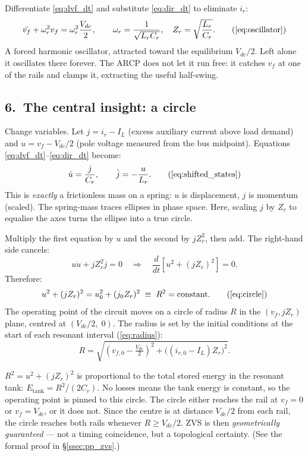 \documentclass[12pt, a4paper]{article}
\def\,{ }%
\newcommand{\Vdc}{V_{dc}}
\newcommand{\vf}{v_f}
\newcommand{\ir}{i_r}
\newcommand{\IL}{I_L}
\newcommand{\Lr}{L_r}
\newcommand{\Cr}{C_r}
\newcommand{\omegar}{\omega_r}
\newcommand{\Zr}{Z_r}
\begin{document}
Differentiate \eqref{eq:dvf_dt} and substitute \eqref{eq:dir_dt} to
eliminate $\ir$:
\begin{equation}
    \ddot{\vf} + \omegar^2\,\vf = \omegar^2\,\frac{\Vdc}{2},
    \qquad
    \omegar = \frac{1}{\sqrt{\Lr\Cr}},\quad
    \Zr = \sqrt{\frac{\Lr}{\Cr}}.
    \tag{\ref{eq:oscillator}}
\end{equation}
A forced harmonic oscillator, attracted toward the equilibrium $\Vdc/2$.
Left alone it oscillates there forever.
The ARCP does not let it run free: it catches $\vf$ at one of the rails and
clamps it, extracting the useful half-swing.

\subsection*{6.\ The central insight: a circle}

Change variables.
Let $j = \ir - \IL$ (excess auxiliary current above load demand) and
$u = \vf - \Vdc/2$ (pole voltage measured from the bus midpoint).
Equations \eqref{eq:dvf_dt}--\eqref{eq:dir_dt} become:
\begin{equation}
    \dot{u} = \frac{j}{\Cr},\qquad \dot{j} = -\frac{u}{\Lr}.
    \tag{\ref{eq:shifted_states}}
\end{equation}
This is \emph{exactly} a frictionless mass on a spring: $u$ is displacement,
$j$ is momentum (scaled).
The spring-mass traces ellipses in phase space.
Here, scaling $j$ by $\Zr$ to equalise the axes turns the ellipse into a
true circle.

Multiply the first equation by $u$ and the second by $j\Zr^2$, then add.
The right-hand side cancels:
\[
    u\dot{u} + j\Zr^2\dot{j} = 0
    \quad\Longrightarrow\quad
    \frac{d}{dt}\!\left[u^2 + (j\Zr)^2\right] = 0.
\]
Therefore:
\begin{equation}
    u^2 + (j\Zr)^2 = u_0^2 + (j_0\Zr)^2 \;\equiv\; R^2
    = \text{constant}.
    \tag{\ref{eq:circle}}
\end{equation}
The operating point of the circuit moves on a circle of radius $R$ in the
$(v_f,\, j Z_r)$ plane, centred at $(\Vdc/2,\; 0)$.
The radius is set by the initial conditions at the start of each resonant
interval (\eqref{eq:radius}):
\[
    R = \sqrt{\!\left(v_{f,0} - \tfrac{\Vdc}{2}\right)^{\!2}
              + \bigl((i_{r,0} - \IL)\,\Zr\bigr)^2}.
\]

\begin{physbox}
$R^2 = u^2 + (j\Zr)^2$ is proportional to the total stored energy in the
resonant tank: $E_\text{tank} = R^2/(2C_r)$.
No losses means the tank energy is constant, so the operating point is pinned
to this circle.
The circle either reaches the rail at $\vf = 0$ or $\vf = \Vdc$, or it does
not.
Since the centre is at distance $\Vdc/2$ from each rail, the circle reaches
both rails whenever $R \geq \Vdc/2$.
ZVS is then \emph{geometrically guaranteed} --- not a timing coincidence, but
a topological certainty.
(See the formal proof in \S\ref{ssec:pp_zvs}.)
\end{physbox}
\end{document}
